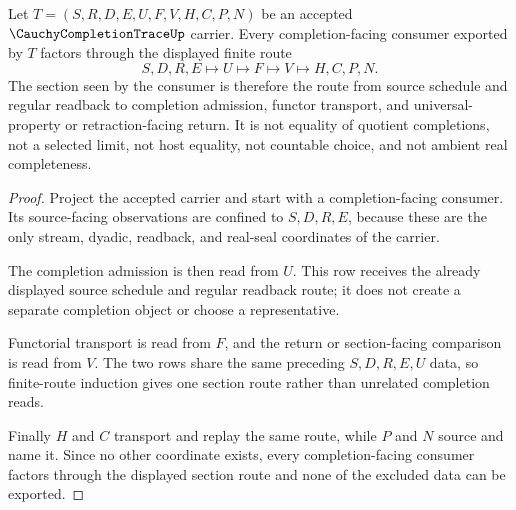 \begin{theorem}
\label{thm:cauchy-completion-trace-section-route}
Let $T=(S,R,D,E,U,F,V,H,C,P,N)$ be an accepted $\CauchyCompletionTraceUp$ carrier. Every completion-facing consumer exported by $T$ factors through the displayed finite route
$$
S,D,R,E \longmapsto U \longmapsto F \longmapsto V \longmapsto H,C,P,N .
$$
The section seen by the consumer is therefore the route from source schedule and regular readback to completion admission, functor transport, and universal-property or retraction-facing return. It is not equality of quotient completions, not a selected limit, not host equality, not countable choice, and not ambient real completeness.
\end{theorem}
\begin{proof}
Project the accepted carrier and start with a completion-facing consumer. Its source-facing observations are confined to $S,D,R,E$, because these are the only stream, dyadic, readback, and real-seal coordinates of the carrier.

The completion admission is then read from $U$. This row receives the already displayed source schedule and regular readback route; it does not create a separate completion object or choose a representative.

Functorial transport is read from $F$, and the return or section-facing comparison is read from $V$. The two rows share the same preceding $S,D,R,E,U$ data, so finite-route induction gives one section route rather than unrelated completion reads.

Finally $H$ and $C$ transport and replay the same route, while $P$ and $N$ source and name it. Since no other coordinate exists, every completion-facing consumer factors through the displayed section route and none of the excluded data can be exported.
\end{proof}

